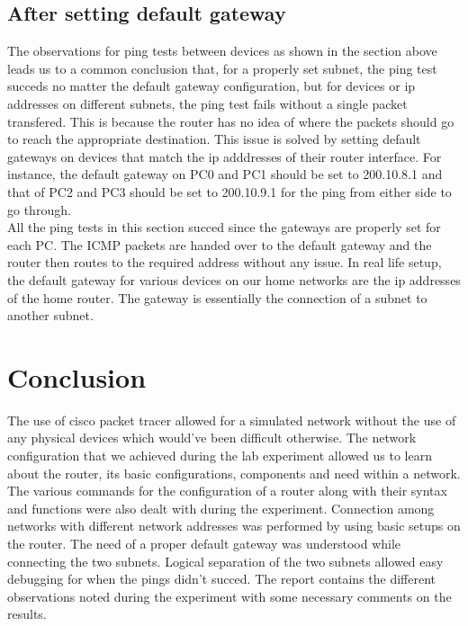 \documentclass{lab_sheet}
\begin{document}
    \subsection*{After setting default gateway}
    The observations for ping tests between devices as shown in the section above leads us to a common conclusion that, for a properly set subnet, the ping test succeds no matter the default gateway configuration, but for devices or ip addresses on different subnets, the ping test fails without a single packet transfered. This is because the router has no idea of where the packets should go to reach the appropriate destination. This issue is solved by setting default gateways on devices that match the ip adddresses of their router interface. For instance, the default gateway on PC0 and PC1 should be set to 200.10.8.1 and that of PC2 and PC3 should be set to 200.10.9.1 for the ping from either side to go through.
    \\All the ping tests in this section succed since the gateways are properly set for each PC. The ICMP packets are handed over to the default gateway and the router then routes to the required address without any issue. In real life setup, the default gateway for various devices on our home networks are the ip addresses of the home router. The gateway is essentially the connection of a subnet to another subnet.
    \section{Conclusion}
    The use of cisco packet tracer allowed for a simulated network without the use of any physical devices which would've been difficult otherwise. The network configuration that we achieved during the lab experiment allowed us to learn about the router, its basic configurations, components and need within a network. The various commands for the configuration of a router along with their syntax and functions were also dealt with during the experiment. Connection among networks with different network addresses was performed by using basic setups on the router. The need of a proper default gateway was understood while connecting the two subnets. Logical separation of the two subnets allowed easy debugging for when the pings didn't succed. The report contains the different observations noted during the experiment with some necessary comments on the results.
\end{document}
